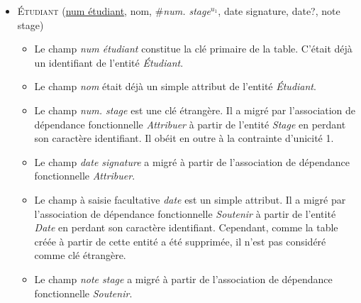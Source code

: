 \documentclass[a4paper]{article}
\newcommand{\relat}[1]{\textsc{#1}}
\newcommand{\attr}[1]{#1}
\newcommand{\prim}[1]{\uline{#1}}
\newcommand{\foreign}[1]{\#\textsl{#1}}
\begin{document}
\begin{itemize}
  \item \relat{Étudiant} (\prim{num étudiant}, \attr{nom}, \foreign{num. stage}$^{u_1}$, \attr{date signature}, \attr{date?}, \attr{note stage})
  \begin{itemize}
    \item Le champ \emph{num étudiant} constitue la clé primaire de la table. C'était déjà un identifiant de l'entité \emph{Étudiant}.
    \item Le champ \emph{nom} était déjà un simple attribut de l'entité \emph{Étudiant}.
    \item Le champ \emph{num. stage} est une clé étrangère. Il a migré par l'association de dépendance fonctionnelle \emph{Attribuer} à partir de l'entité \emph{Stage} en perdant son caractère identifiant. Il obéit en outre à la contrainte d'unicité 1.
    \item Le champ \emph{date signature} a migré à partir de l'association de dépendance fonctionnelle \emph{Attribuer}.
    \item Le champ à saisie facultative \emph{date} est un simple attribut. Il a migré par l'association de dépendance fonctionnelle \emph{Soutenir} à partir de l'entité \emph{Date} en perdant son caractère identifiant. Cependant, comme la table créée à partir de cette entité a été supprimée, il n'est pas considéré comme clé étrangère.
    \item Le champ \emph{note stage} a migré à partir de l'association de dépendance fonctionnelle \emph{Soutenir}.
  \end{itemize}

\end{itemize}
\end{document}
